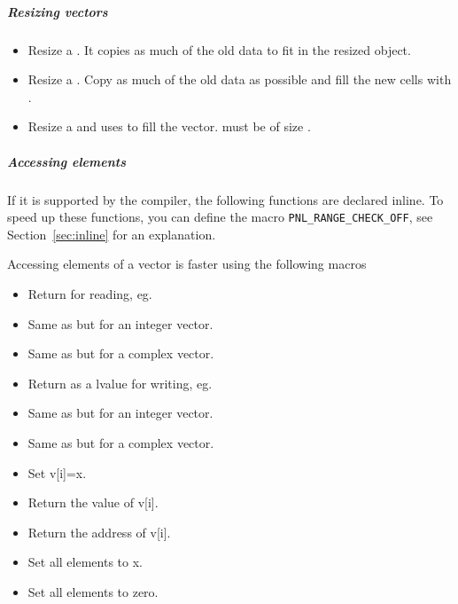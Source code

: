 \subparagraph{Resizing vectors}
\begin{itemize}
\item {}
  \sshortdescribe Resize a \PnlVect. It copies as much of the old
  data to fit in the resized object.
  \item {} 
  \sshortdescribe Resize a \PnlVect. Copy as much of the old data as possible and fill the new cells with .
\item {} 
  \sshortdescribe Resize a \PnlVect and uses  to fill the
  vector.  must be of size .
\end{itemize}  

\subparagraph{Accessing elements}

If it is supported by the compiler, the following functions are declared
inline. To speed up these functions, you can define the macro 
\texttt{PNL_RANGE_CHECK_OFF}, see Section~\ref{sec:inline} for an explanation. 

Accessing elements of a vector is faster using the following macros
\begin{itemize}
\item {}
  \sshortdescribe Return  for reading, eg. 
\item {}
  \sshortdescribe Same as  but for an integer vector.
\item {}
  \sshortdescribe Same as  but for a complex vector.
\item {}
  \sshortdescribe Return  as a lvalue for writing, eg.
\item {}
  \sshortdescribe Same as  but for an integer vector.
\item {}
  \sshortdescribe Same as  but for a complex vector.
\end{itemize}

\begin{itemize}
\item {}
  \sshortdescribe Set v[i]=x.
\item {}
  \sshortdescribe Return the value of v[i].
\item {}
  \sshortdescribe Return the address of v[i].
\item {}
  \sshortdescribe Set all elements to x.
\item {}
  \sshortdescribe Set all elements to zero.
\end{itemize}


